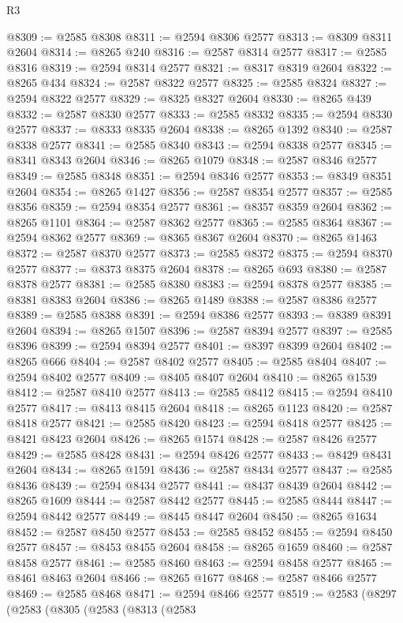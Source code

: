 \begin{lexlean}{R3}
\begin{coremodule}
@8309 := @2585 @8308
@8311 := @2594 @8306 @2577
@8313 := @8309 @8311 @2604
@8314 := @8265 @240
@8316 := @2587 @8314 @2577
@8317 := @2585 @8316
@8319 := @2594 @8314 @2577
@8321 := @8317 @8319 @2604
@8322 := @8265 @434
@8324 := @2587 @8322 @2577
@8325 := @2585 @8324
@8327 := @2594 @8322 @2577
@8329 := @8325 @8327 @2604
@8330 := @8265 @439
@8332 := @2587 @8330 @2577
@8333 := @2585 @8332
@8335 := @2594 @8330 @2577
@8337 := @8333 @8335 @2604
@8338 := @8265 @1392
@8340 := @2587 @8338 @2577
@8341 := @2585 @8340
@8343 := @2594 @8338 @2577
@8345 := @8341 @8343 @2604
@8346 := @8265 @1079
@8348 := @2587 @8346 @2577
@8349 := @2585 @8348
@8351 := @2594 @8346 @2577
@8353 := @8349 @8351 @2604
@8354 := @8265 @1427
@8356 := @2587 @8354 @2577
@8357 := @2585 @8356
@8359 := @2594 @8354 @2577
@8361 := @8357 @8359 @2604
@8362 := @8265 @1101
@8364 := @2587 @8362 @2577
@8365 := @2585 @8364
@8367 := @2594 @8362 @2577
@8369 := @8365 @8367 @2604
@8370 := @8265 @1463
@8372 := @2587 @8370 @2577
@8373 := @2585 @8372
@8375 := @2594 @8370 @2577
@8377 := @8373 @8375 @2604
@8378 := @8265 @693
@8380 := @2587 @8378 @2577
@8381 := @2585 @8380
@8383 := @2594 @8378 @2577
@8385 := @8381 @8383 @2604
@8386 := @8265 @1489
@8388 := @2587 @8386 @2577
@8389 := @2585 @8388
@8391 := @2594 @8386 @2577
@8393 := @8389 @8391 @2604
@8394 := @8265 @1507
@8396 := @2587 @8394 @2577
@8397 := @2585 @8396
@8399 := @2594 @8394 @2577
@8401 := @8397 @8399 @2604
@8402 := @8265 @666
@8404 := @2587 @8402 @2577
@8405 := @2585 @8404
@8407 := @2594 @8402 @2577
@8409 := @8405 @8407 @2604
@8410 := @8265 @1539
@8412 := @2587 @8410 @2577
@8413 := @2585 @8412
@8415 := @2594 @8410 @2577
@8417 := @8413 @8415 @2604
@8418 := @8265 @1123
@8420 := @2587 @8418 @2577
@8421 := @2585 @8420
@8423 := @2594 @8418 @2577
@8425 := @8421 @8423 @2604
@8426 := @8265 @1574
@8428 := @2587 @8426 @2577
@8429 := @2585 @8428
@8431 := @2594 @8426 @2577
@8433 := @8429 @8431 @2604
@8434 := @8265 @1591
@8436 := @2587 @8434 @2577
@8437 := @2585 @8436
@8439 := @2594 @8434 @2577
@8441 := @8437 @8439 @2604
@8442 := @8265 @1609
@8444 := @2587 @8442 @2577
@8445 := @2585 @8444
@8447 := @2594 @8442 @2577
@8449 := @8445 @8447 @2604
@8450 := @8265 @1634
@8452 := @2587 @8450 @2577
@8453 := @2585 @8452
@8455 := @2594 @8450 @2577
@8457 := @8453 @8455 @2604
@8458 := @8265 @1659
@8460 := @2587 @8458 @2577
@8461 := @2585 @8460
@8463 := @2594 @8458 @2577
@8465 := @8461 @8463 @2604
@8466 := @8265 @1677
@8468 := @2587 @8466 @2577
@8469 := @2585 @8468
@8471 := @2594 @8466 @2577
@8519 := @2583
    (@8297
      (@2583
        (@8305
          (@2583
            (@8313
              (@2583

\end{coremodule}
\end{lexlean}
